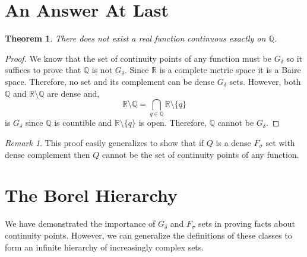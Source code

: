 \documentclass{article}
\newcommand{\Q}{\mathbb{Q}}
\newcommand{\R}{\mathbb{R}}
\theoremstyle{theorem}
\newtheorem{theorem}{Theorem}[section]
\theoremstyle{definition}
\theoremstyle{definition}
\theoremstyle{remark}
\theoremstyle{definition}
\theoremstyle{remark}
\newtheorem{remark}{Remark}[subsection]
\begin{document}
\section{An Answer At Last}

\begin{theorem}
There does not exist a real function continuous exactly on $\Q$.
\end{theorem}

\begin{proof}
We know that the set of continuity points of any function must be $G_{\delta}$ so it suffices to prove that $\Q$ is not $G_{\delta}$. Since $\R$ is a complete metric space it is a Baire space. Therefore, no set and its complement can be dense $G_{\delta}$ sets. However, both $\Q$ and $\R \setminus \Q$ are dense and,
\[ \R \setminus \Q = \bigcap_{q \in \Q} \R \setminus \{q\} \]
is $G_{\delta}$ since $\Q$ is countible and $\R \setminus \{q\}$ is open. Therefore, $\Q$ cannot be $G_{\delta}$. 
\end{proof}

\begin{remark}
This proof easily generalizes to show that if $Q$ is a dense $F_{\sigma}$ set with dense complement then $Q$ cannot be the set of continuity points of any function. 
\end{remark}

\section{The Borel Hierarchy} 

We have demonstrated the importance of $G_{\delta}$ and $F_{\sigma}$ sets in proving facts about continuity points. However, we can generalize the definitions of these classes to form an infinite hierarchy of increasingly complex sets. 

\newcommand{\BHS}[1]{\mathbf{\Sigma}^0_{#1}}
\newcommand{\BHP}[1]{\mathbf{\Pi}^0_{#1}}
\newcommand{\BHD}[1]{\mathbf{\Delta}^0_{#1}}
\end{document}

